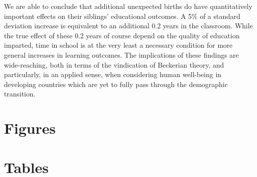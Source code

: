 \documentclass[subeqn]{article}
\newcommand{\twinfolder}{"/home/damian/investigacion/Activa/Twins"}
\begin{document}
\begin{spacing}{1.4}
We are able to conclude that additional unexpected births do have
quantitatively important effects on their siblings' educational outcomes.  
A 5\% of a standard deviation increase is equivalent to an additional 0.2
years in the classroom.  While the true effect of these 0.2 years of course
depend on the quality of education imparted, time in school is at the very 
least a necessary condition for more general increases in learning outcomes.  
The implications of these findings are wide-reaching, both in terms of the 
vindication of Beckerian theory, and particularly, in an applied sense, when 
considering human well-being in developing countries which are yet to fully 
pass through the demographic transition.



\newpage
\section*{Figures}


\clearpage
\section*{Tables}

\clearpage






\begin{landscape}

\end{landscape}




\clearpage




\end{spacing}
\end{document}

